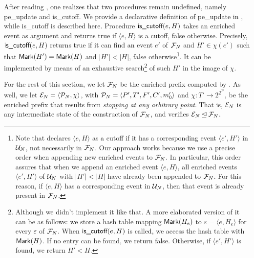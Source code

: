 \documentclass[11pt,a4paper]{article}
\newcommand{\peupdate}{\mbox{\sf pe\_update}}
\newcommand{\iscutoff}{\mbox{\sf is\_cutoff}}
\begin{document}
After reading , one realizes that two procedures
remain undefined, namely \peupdate{} and \iscutoff{}.  We provide a declarative
definition of \peupdate{} in , while \iscutoff{} is
described here.  Procedure $\iscutoff (e, H)$ takes an enriched event as
argument and returns true if $\langle e, H \rangle$ is a cutoff, false
otherwise.  Precisely, $\iscutoff (e, H)$ returns true if it can find an event
$e'$ of $\mathcal{F}_{N}$ and $H' \in \chi (e')$ such that $\mathsf{Mark }{(H')} = \mathsf{Mark }{(H)}$
and $|H'| < |H|$, false otherwise\footnote{Note that  declares
$\langle e, H \rangle$ as a cutoff if it has a corresponding event $\langle e',
H' \rangle$ in $\mathcal{U}_{N}$, not necessarily in $\mathcal{F}_{N}$.  Our approach works
because we use a precise order when appending new enriched events to $\mathcal{F}_{N}$.
In particular, this order assures that when we append an enriched event
$\langle e, H \rangle$, all enriched events $\langle e', H' \rangle$ of $\mathcal{U}_{N}$ with $|H'| < |H|$ have already been appended to $\mathcal{F}_{N}$.  For this reason,
if $\langle e, H \rangle$ has a corresponding event in $\mathcal{U}_{N}$, then that
event is already present in $\mathcal{F}_{N}$.}.  It can be implemented by means of an
exhaustive search\footnote{Although we didn't implement it like that.  A more
elaborated version of it can be as follows:  we store a hash table mapping
$\mathsf{Mark }{(H_e)}$ to $\varepsilon = \langle e, H_e \rangle$ for every
$\varepsilon$ of $\mathcal{F}_{N}$.  When $\iscutoff (e, H)$ is called, we access the
hash table with $\mathsf{Mark }{(H)}$.  If no entry can be found, we return false.
Otherwise, if $\langle e', H' \rangle$ is found, we return $H' < H$.} of such
$H'$ in the image of $\chi$.  

For the rest of this section, we let $\mathcal{F}_{N}$ be the enriched prefix computed
by .  As well, we let $\mathcal{E}_{N} = \langle \mathcal{P}_{N}, \chi
\rangle$, with $\mathcal{P}_{N} = \langle P', T', F', C', m'_0 \rangle$ and $\chi : T'
\to 2^{2^{T'}}$, be the enriched prefix that results from \emph{stopping
 at any arbitrary point}.  That is, $\mathcal{E}_{N}$ is any
intermediate state of the construction of $\mathcal{F}_{N}$, and verifies $\mathcal{E}_{N} \unlhd
\mathcal{F}_{N}$.
\end{document}
